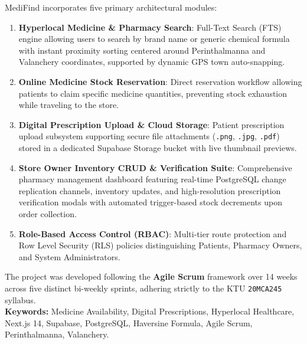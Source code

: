\documentclass[12pt,a4paper]{report}
\begin{document}
\noindent MediFind incorporates five primary architectural modules:
\begin{enumerate}
    \item \textbf{Hyperlocal Medicine \& Pharmacy Search}: Full-Text Search (FTS) engine allowing users to search by brand name or generic chemical formula with instant proximity sorting centered around Perinthalmanna and Valanchery coordinates, supported by dynamic GPS town auto-snapping.
    \item \textbf{Online Medicine Stock Reservation}: Direct reservation workflow allowing patients to claim specific medicine quantities, preventing stock exhaustion while traveling to the store.
    \item \textbf{Digital Prescription Upload \& Cloud Storage}: Patient prescription upload subsystem supporting secure file attachments (\texttt{.png}, \texttt{.jpg}, \texttt{.pdf}) stored in a dedicated Supabase Storage bucket with live thumbnail previews.
    \item \textbf{Store Owner Inventory CRUD \& Verification Suite}: Comprehensive pharmacy management dashboard featuring real-time PostgreSQL change replication channels, inventory updates, and high-resolution prescription verification modals with automated trigger-based stock decrements upon order collection.
    \item \textbf{Role-Based Access Control (RBAC)}: Multi-tier route protection and Row Level Security (RLS) policies distinguishing Patients, Pharmacy Owners, and System Administrators.
\end{enumerate}

\noindent The project was developed following the \textbf{Agile Scrum} framework over 14 weeks across five distinct bi-weekly sprints, adhering strictly to the KTU \texttt{20MCA245} syllabus.\\[0.6cm]

\noindent \textbf{Keywords:} Medicine Availability, Digital Prescriptions, Hyperlocal Healthcare, Next.js 14, Supabase, PostgreSQL, Haversine Formula, Agile Scrum, Perinthalmanna, Valanchery.

\newpage
\tableofcontents

\newpage
\listoffigures

\newpage
\listoftables

\newpage
\end{document}
